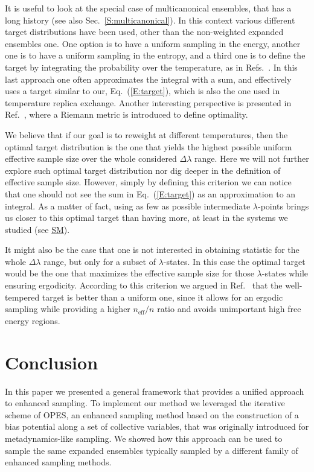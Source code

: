 \documentclass[aps,prx,reprint,superscriptaddress]{revtex4-1} %
\begin{document}
It is useful to look at the special case of multicanonical ensembles, that has a long history (see also Sec.~\ref{S:multicanonical}).
In this context various different target distributions have been used, other than the non-weighted expanded ensembles one.
One option is to have a uniform sampling in the energy\cite{Berg1991,Lee1993,Piaggi2019}, another one is to have a uniform sampling in the entropy\cite{Hesselbo1995}, and a third one is to define the target by integrating the probability over the temperature, as in Refs.~.
In this last approach one often approximates the integral with a sum, and effectively uses a target similar to our, Eq.~(\ref{E:target}), which is also the one used in temperature replica exchange.
Another interesting perspective is presented in Ref.~, where a Riemann metric is introduced to define optimality.

We believe that if our goal is to reweight at different temperatures, then the optimal target distribution is the one that yields the highest possible uniform effective sample size over the whole considered $\Delta \lambda$ range.
Here we will not further explore such optimal target distribution nor dig deeper in the definition of effective sample size.
However, simply by defining this criterion we can notice that one should not see the sum in Eq.~(\ref{E:target}) as an approximation to an integral.
As a matter of fact, using as few as possible intermediate $\lambda$-points brings us closer to this optimal target than having more, at least in the systems we studied (see \href{https://arxiv.org/src/2007.03055v3/anc/SupplementalMaterial.pdf}{SM}).

It might also be the case that one is not interested in obtaining statistic for the whole $\Delta \lambda$ range, but only for a subset of $\lambda$-states.
In this case the optimal target would be the one that maximizes the effective sample size for those $\lambda$-states while ensuring ergodicity.
According to this criterion we argued in Ref.~ that the well-tempered target is better than a uniform one, since it allows for an ergodic sampling while providing a higher $n_{\text{eff}}/n$ ratio and avoids unimportant high free energy regions.


\section{Conclusion}
In this paper we presented a general framework that provides a unified approach to enhanced sampling.
To implement our method we leveraged the iterative scheme of OPES, an enhanced sampling method based on the construction of a bias potential along a set of collective variables, that was originally introduced for metadynamics-like sampling.
We showed how this approach can be used to sample the same expanded ensembles typically sampled by a different family of enhanced sampling methods.
\end{document}
